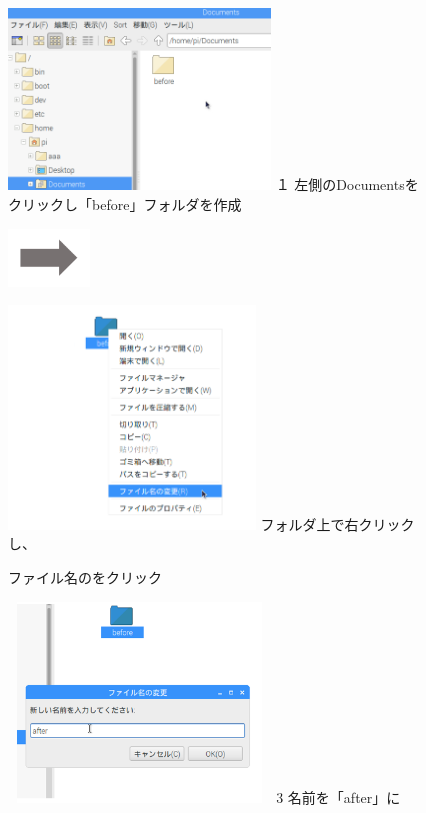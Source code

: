 \documentclass[a4paper,12pt]{jarticle}
\begin{document}
\begin{figure}[ht]
  \begin{minipage}{6.656cm}
    \includegraphics[width=6.96cm,height=4.824cm]{textbook-img058.png}
    \flushleft
    １
    左側のDocumentsをクリックし「before」フォルダを作成
  \end{minipage}
  \includegraphics[width=2.168cm,height=1.542cm]{textbook-img052.png}
  \begin{minipage}{5.751cm}
    \includegraphics[width=6.555cm,height=5.941cm]{textbook-img057.png}
     フォルダ上で右クリックし、

    ファイル名のをクリック
  \end{minipage}

  \begin{minipage}{6.973cm}
    \includegraphics[width=6.973cm,height=5.327cm]{textbook-img055.png}
    3 名前を「after」に


\end{minipage}
\end{figure}
\end{document}
